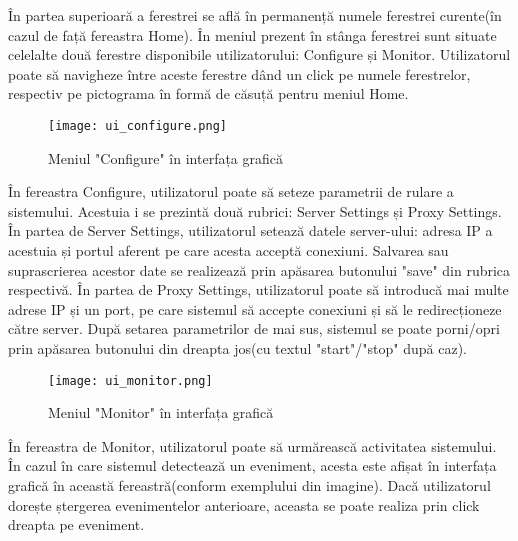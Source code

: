 În partea superioară a ferestrei se află în permanență numele ferestrei curente(în cazul de față fereastra Home). În meniul prezent în stânga ferestrei sunt situate celelalte două ferestre disponibile utilizatorului: Configure și Monitor. Utilizatorul poate să navigheze între aceste ferestre dând un click pe numele ferestrelor, respectiv pe pictograma în formă de căsuță pentru meniul Home.  \\

\begin{figure}[h]
	\centering
	\texttt{[image: ui\_configure.png]}
	\caption{ Meniul "Configure" în interfața grafică }
	\label{fig:8_ui_configure}
\end{figure}

În fereastra Configure, utilizatorul poate să seteze parametrii de rulare a sistemului. Acestuia i se prezintă două rubrici: Server Settings și Proxy Settings. În partea de Server Settings, utilizatorul setează datele server-ului: adresa IP a acestuia și portul aferent pe care acesta acceptă conexiuni. Salvarea sau suprascrierea acestor date se realizează prin apăsarea butonului "save" din rubrica respectivă. În partea de Proxy Settings, utilizatorul poate să introducă mai multe adrese IP și un port, pe care sistemul să accepte conexiuni și să le redirecționeze către server. După setarea parametrilor de mai sus, sistemul se poate porni/opri prin apăsarea butonului din dreapta jos(cu textul "start"/"stop" după caz). 
\newpage
\begin{figure}[h]
	\centering
	\texttt{[image: ui\_monitor.png]}
	\caption{ Meniul "Monitor" în interfața grafică }
	\label{fig:8_ui_monitor}
\end{figure}

În fereastra de Monitor, utilizatorul poate să urmărească activitatea sistemului. În cazul în care sistemul detectează un eveniment, acesta este afișat în interfața grafică în această fereastră(conform exemplului din imagine). Dacă utilizatorul dorește ștergerea evenimentelor anterioare, aceasta se poate realiza prin click dreapta pe eveniment. 